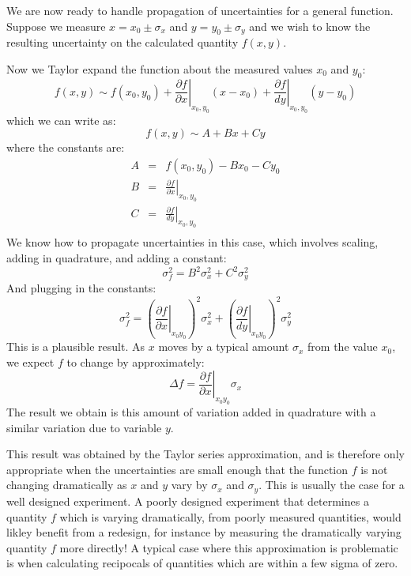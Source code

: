 \documentclass[12pt,oneside]{book}
\begin{document}
We are now ready to handle propagation of uncertainties for a general
function.  Suppose we measure $x = x_0 \pm \sigma_x$ and $y = y_0 \pm
\sigma_y$ and we wish to know the resulting uncertainty on the
calculated quantity $f(x,y)$.

Now we Taylor expand the function about the measured values $x_0$ and $y_0$:
\begin{equation*}
f(x,y) \sim f(x_0,y_0) + \left.\frac{\partial f}{\partial x}\right|_{x_0,y_0} (x-x_0) + \left.\frac{\partial f}{dy}\right|_{x_0,y_0} (y-y_0) 
\end{equation*}
which we can write as:
\begin{equation*}
f(x,y) \sim A + B x + C y 
\end{equation*}
where the constants are:
\begin{eqnarray*}
  A  &=& f(x_0,y_0) - B x_0 - C y_0\\
  B  &=& \left.\frac{\partial f}{\partial x}\right|_{x_0,y_0}\\
  C  &=& \left.\frac{\partial f}{dy}\right|_{x_0,y_0}\\
\end{eqnarray*}
We know how to propagate uncertainties in this case, which involves scaling, adding in quadrature, and adding a constant:
\begin{equation*}
\sigma_f^2 =   B^2 \sigma_x^2 + C^2 \sigma_y^2 
\end{equation*}
And plugging in the constants:
\begin{equation*}
\sigma^2_f = \left(\left.\frac{\partial f}{\partial x}\right|_{x_0 y_0} \right)^2 \sigma^2_x  + \left( \left.\frac{\partial f}{dy} \right|_{x_0 y_0} \right)^2 \sigma^2_y
\end{equation*}   
This is a plausible result.  As $x$ moves by a typical amount $\sigma_x$ from the value $x_0$, we expect $f$ to change by approximately:
\begin{equation*}
  \Delta f = \left.\frac{\partial f}{\partial x}\right|_{x_0 y_0} \sigma_x
\end{equation*}   
The result we obtain is this amount of variation added in quadrature with a similar variation due to variable $y$.

This result was obtained by the Taylor series approximation, and is
therefore only appropriate when the uncertainties are small enough
that the function $f$ is not changing dramatically as $x$ and $y$ vary
by $\sigma_x$ and $\sigma_y$.  This is usually the case for a well
designed experiment.  A poorly designed experiment that determines a
quantity $f$ which is varying dramatically, from poorly measured
quantities, would likley benefit from a redesign, for instance by
measuring the dramatically varying quantity $f$ more directly!  A
typical case where this approximation is problematic is when
calculating recipocals of quantities which are within a few sigma of
zero.
\end{document}
